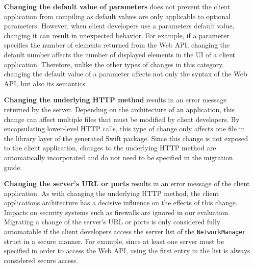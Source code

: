 \textbf{Changing the default value of parameters} does not prevent the client application from compiling as default values are only applicable to optional parameters. However, when client developers use a parameters default value, changing it can result in unexpected behavior. For example, if a parameter specifies the number of elements returned from the Web API, changing the default number affects the number of displayed elements in the UI of a client application. Therefore, unlike the other types of changes in this category, changing the default value of a parameter affects not only the syntax of the Web API, but also its semantics.

\textbf{Changing the underlying HTTP method} results in an error message returned by the server. Depending on the architecture of an application, this change can affect multiple files that must be modified by client developers. By encapsulating lower-level HTTP calls, this type of change only affects one file in the library layer of the generated Swift package. Since this change is not exposed to the client application, changes to the underlying HTTP method are automatically incorporated and do not need to be specified in the migration guide.

\textbf{Changing the server's URL or ports} results in an error message of the client application. As with changing the underlying HTTP method, the client applications architecture has a decisive influence on the effects of this change. Impacts on security systems such as firewalls are ignored in our evaluation. Migrating a change of the server's URL or ports is only considered fully automatable if the client developers access the server list of the \texttt{NetworkManager} struct in a secure manner. For example, since at least one server must be specified in order to access the Web API, using the first entry in the list is always considered secure access.